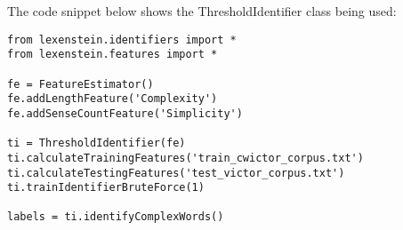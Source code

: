 The code snippet below shows the ThresholdIdentifier class being used:

\begin{lstlisting}
from lexenstein.identifiers import *
from lexenstein.features import *

fe = FeatureEstimator()
fe.addLengthFeature('Complexity')
fe.addSenseCountFeature('Simplicity')

ti = ThresholdIdentifier(fe)
ti.calculateTrainingFeatures('train_cwictor_corpus.txt')
ti.calculateTestingFeatures('test_victor_corpus.txt')
ti.trainIdentifierBruteForce(1)

labels = ti.identifyComplexWords()
\end{lstlisting}